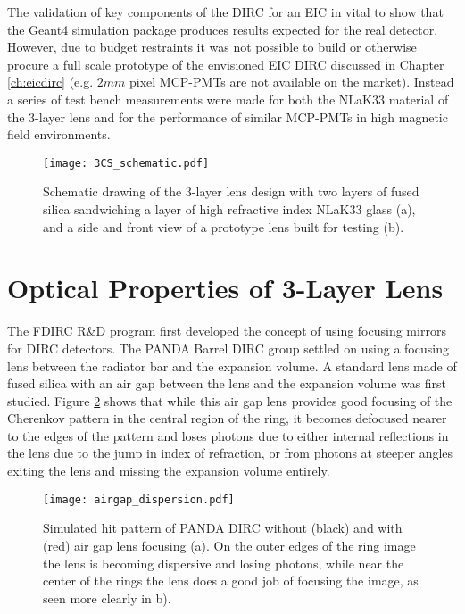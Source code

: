 \label{ch:components}
The validation of key components of the DIRC for an EIC in vital to show that the Geant4 simulation package produces results expected for the real detector. However, due to budget restraints it was not possible to build or otherwise procure a full scale prototype of the envisioned EIC DIRC discussed in Chapter \ref{ch:eicdirc} (e.g. $2\unit{mm}$ pixel MCP-PMTs are not available on the market). Instead a series of test bench measurements were made for both the NLaK33 material of the 3-layer lens and for the performance of similar MCP-PMTs in high magnetic field environments.

\begin{figure}[ht]
	\centering
	\texttt{[image: 3CS\_schematic.pdf]}
	\caption{Schematic drawing of the 3-layer lens design with two layers of fused silica sandwiching a layer of high refractive index NLaK33 glass (a), and a side and front view of a prototype lens built for testing (b).}
	\label{fig:3CS_schematic}
\end{figure}



\section{Optical Properties of 3-Layer Lens}
The FDIRC R\&D program first developed the concept of using focusing mirrors for DIRC detectors. The PANDA Barrel DIRC group settled on using a focusing lens between the radiator bar and the expansion volume. A standard lens made of fused silica with an air gap between the lens and the expansion volume was first studied. Figure \ref{fig:airgap_dispersion} shows that while this air gap lens provides good focusing of the Cherenkov pattern in the central region of the ring, it becomes defocused nearer to the edges of the pattern and loses photons due to either internal reflections in the lens due to the jump in index of refraction, or from photons at steeper angles exiting the lens and missing the expansion volume entirely.

\begin{figure}[ht]
	\centering
	\texttt{[image: airgap\_dispersion.pdf]}
	\caption{Simulated hit pattern of PANDA DIRC without (black) and with (red) air gap lens focusing (a). On the outer edges of the ring image the lens is becoming dispersive  and losing photons, while near the center of the rings the lens does a good job of focusing the image, as seen more clearly in b).}
	\label{fig:airgap_dispersion}
\end{figure}

